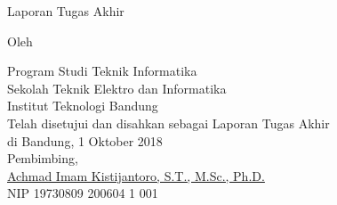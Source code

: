 \clearpage
\pagestyle{plain}

\begin{center}
\smallskip

    \Large \bfseries \MakeUppercase{\thetitle}
    \vfill

    \Large Laporan Tugas Akhir
    \vfill

    \large Oleh

    \Large \theauthor

    \large Program Studi Teknik Informatika \\
    \normalsize \normalfont
    Sekolah Teknik Elektro dan Informatika \\
    Institut Teknologi Bandung \\

    \vfill
    \normalsize \normalfont
    Telah disetujui dan disahkan sebagai Laporan Tugas Akhir \\
    di Bandung, 1 Oktober 2018 \\

    \vspace{0.6 cm}
    Pembimbing, \\

    \vspace{2 cm}
    \underline{Achmad Imam Kistijantoro, S.T., M.Sc., Ph.D.} \\
    NIP 19730809 200604 1 001 \\

\end{center}
\clearpage
